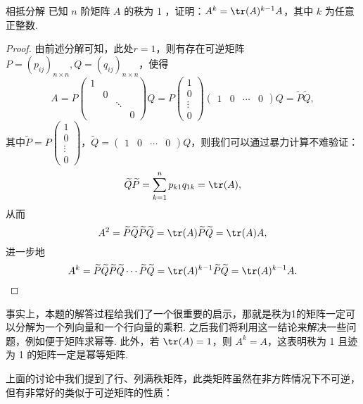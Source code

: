 \begin{example}{}{相抵分解}
    已知 $n$ 阶矩阵 $A$ 的秩为 1 ，证明：$A^k=\tr(A)^{k-1}A$，其中 $k$ 为任意正整数.
\end{example}

\begin{proof}
    由前述分解可知，此处$r=1$，则有存在可逆矩阵 $P=(p_{ij})_{n \times n},Q=(q_{ij})_{n \times n}$，使得
    \[A=P\begin{pmatrix}
            1 &   &        &   \\
              & 0 &        &   \\
              &   & \ddots &   \\
              &   &        & 0
        \end{pmatrix} Q=P\begin{pmatrix}
            1 \\ 0 \\ \vdots \\ 0
        \end{pmatrix}\begin{pmatrix}
            1 & 0 & \cdots & 0
        \end{pmatrix} Q=\widetilde{P} \widetilde{Q},\]
    其中$\widetilde{P}=P\begin{pmatrix}
            1 \\ 0 \\ \vdots \\ 0
        \end{pmatrix}$，$\widetilde{Q}=\begin{pmatrix}
            1 & 0 & \cdots & 0
        \end{pmatrix} Q$，则我们可以通过暴力计算不难验证：
    \[\widetilde{Q} \widetilde{P}=\sum_{k=1}^{n} p_{k1} q_{1k}=\tr(A),\]
    从而
    \[A^{2}=\widetilde{P} \widetilde{Q} \widetilde{P} \widetilde{Q}=\tr(A) \widetilde{P} \widetilde{Q}=\tr(A) A,\]
    进一步地
    \[A^{k}=\widetilde{P} \widetilde{Q} \widetilde{P} \widetilde{Q} \cdots \widetilde{P} \widetilde{Q}=\tr(A)^{k-1} \widetilde{P} \widetilde{Q}=\tr(A)^{k-1} A.\]
\end{proof}

事实上，本题的解答过程给我们了一个很重要的启示，那就是秩为1的矩阵一定可以分解为一个列向量和一个行向量的乘积. 之后我们将利用这一结论来解决一些问题，例如便于矩阵求幂等. 此外，若 $\tr(A) = 1$，则 $A^k = A$，这表明秩为 1 且迹为 1 的矩阵一定是幂等矩阵.

上面的讨论中我们提到了行、列满秩矩阵，此类矩阵虽然在非方阵情况下不可逆，但有非常好的类似于可逆矩阵的性质：

